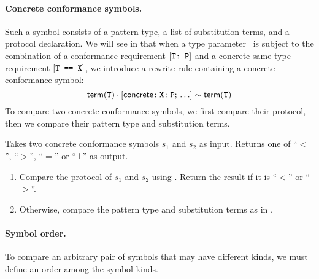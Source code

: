 \documentclass[../generics]{subfiles}
\begin{document}
\paragraph{Concrete conformance symbols.} Such a symbol consists of a pattern type, a list of substitution terms, and a protocol declaration. We will see in  that when a type parameter \tT\ is subject to the combination of a conformance requirement $[\texttt{T:~P}]$ and a concrete same-type requirement $[\texttt{T == X}]$, we introduce a rewrite rule containing a concrete conformance symbol:
\[\mathsf{term}(\texttt{T})\cdot[\mathsf{concrete}\colon \texttt{X}\colon\texttt{P};\,\ldots] \sim \mathsf{term}(\texttt{T})\]
To compare two concrete conformance symbols, we first compare their protocol, then we compare their pattern type and substitution terms.
\begin{algorithm}\label{concrete conformance reduction order}
Takes two concrete conformance symbols $s_1$ and $s_2$ as input. Returns one of ``$<$'', ``$>$'', ``$=$'' or \index{$\bot$}``$\bot$'' as output.
\begin{enumerate}
\item Compare the protocol of $s_1$ and $s_2$ using . Return the result if it is ``$<$'' or ``$>$''.
\item Otherwise, compare the pattern type and substitution terms as in .
\end{enumerate}
\end{algorithm}

\paragraph{Symbol order.} To compare an arbitrary pair of symbols that may have different kinds, we must define an order among the symbol kinds.
\end{document}
